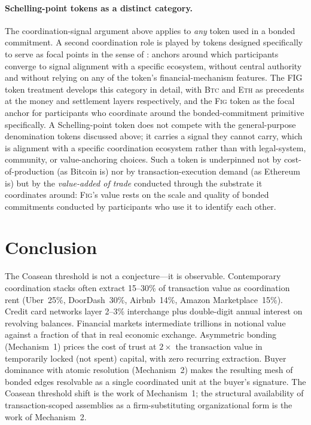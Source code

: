 \documentclass[11pt,a4paper]{article}
\theoremstyle{definition}
\theoremstyle{remark}
\newcommand{\fig}{\textsc{Fig}}
\begin{document}
\paragraph{Schelling-point tokens as a distinct category.}
The coordination-signal argument above applies to \emph{any}
token used in a bonded commitment. A second coordination role is
played by tokens designed specifically to serve as focal points
in the sense of \citet{schelling1960strategy}: anchors around
which participants converge to signal alignment with a specific
ecosystem, without central authority and without relying on any
of the token's financial-mechanism features. The FIG token
treatment develops this category in detail, with \textsc{Btc}
and \textsc{Eth} as precedents at the
money and settlement layers respectively, and the \fig{} token
as the focal anchor for participants who coordinate around the
bonded-commitment primitive specifically. A Schelling-point
token does not compete with the general-purpose denomination
tokens discussed above; it carries a signal they cannot carry,
which is alignment with a specific coordination ecosystem rather
than with legal-system, community, or value-anchoring choices.
Such a token is underpinned not by cost-of-production (as Bitcoin
is) nor by transaction-execution demand (as Ethereum is) but by
the \emph{value-added of trade} conducted through the substrate
it coordinates around: \fig{}'s value rests on the scale and
quality of bonded commitments conducted by participants who use
it to identify each other.

\section{Conclusion}
\label{sec:conclusion}

The Coasean threshold is not a conjecture---it is observable.
Contemporary coordination stacks often extract 15--30\% of
transaction value as coordination rent (Uber~25\%, DoorDash~30\%,
Airbnb~14\%, Amazon Marketplace~15\%). Credit card networks layer
2--3\% interchange plus double-digit annual interest on revolving
balances. Financial markets intermediate trillions in notional
value against a fraction of that in real economic exchange.
Asymmetric bonding (Mechanism~1) prices the cost of trust at
$2\times$ the transaction value in temporarily locked (not spent)
capital, with zero recurring extraction. Buyer dominance with
atomic resolution (Mechanism~2) makes the resulting mesh of
bonded edges resolvable as a single coordinated unit at the buyer's
signature. The Coasean threshold shift is the work of Mechanism~1;
the structural availability of transaction-scoped assemblies as a
firm-substituting organizational form is the work of Mechanism~2.
\end{document}
